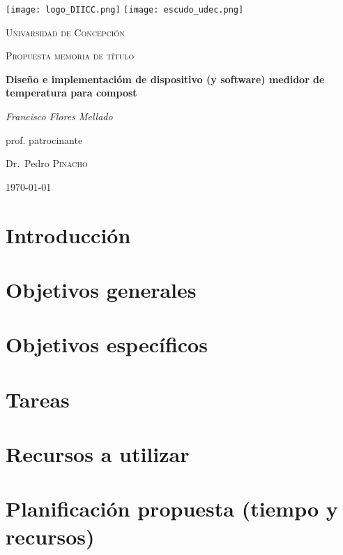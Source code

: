 \documentclass[12pt, letterpaper]{article}
\begin{document}
\begin{titlepage}
	\centering			
	\texttt{[image: logo\_DIICC.png]}
	\texttt{[image: escudo\_udec.png]}
	\par\vspace{1cm}
	{\scshape\LARGE Univarsidad de Concepción \par}
	\vspace{1cm}
	{\scshape\Large Propuesta memoria de título\par}
	\vspace{1.5cm}
	{\huge\bfseries Diseño e implementacióm de dispositivo (y software) medidor de temperatura para compost\par}
	\vspace{2cm}
	{\Large\itshape Francisco Flores Mellado\par}
	\vfill
	prof. patrocinante\par
	Dr.~Pedro \textsc{Pinacho}

	\vfill

	{\large \today\par}
\end{titlepage}

\section{Introducción}


\section{Objetivos generales}

\section{Objetivos específicos}

\section{Tareas}

\section{Recursos a utilizar}

\section{Planificación propuesta (tiempo y recursos)}
\end{document}
